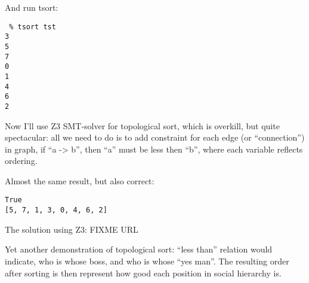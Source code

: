 And run tsort:

\begin{lstlisting}
 % tsort tst
3
5
7
0
1
4
6
2
\end{lstlisting}

Now I'll use Z3 SMT-solver for topological sort, which is overkill, but quite spectacular: all we need to do
is to add constraint for each edge (or ``connection'') in graph, if ``a -> b'', then ``a'' must be less then ``b'', where
each variable reflects ordering.



Almost the same result, but also correct:

\begin{lstlisting}
True
[5, 7, 1, 3, 0, 4, 6, 2]
\end{lstlisting}

The solution using Z3: FIXME URL

Yet another demonstration of topological sort: ``less than'' relation would indicate, 
who is whose boss, and who is whose ``yes man''.
The resulting order after sorting is then represent how good each position in social hierarchy is.

